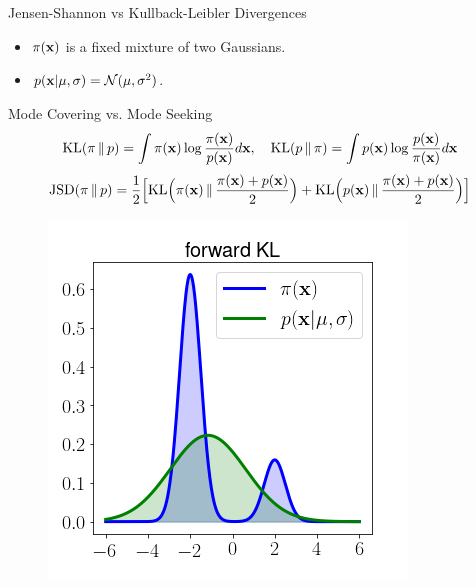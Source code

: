 \documentclass{beamer}
\begin{document}
\begin{frame}{Jensen-Shannon vs Kullback-Leibler Divergences}
	\begin{itemize}
		\item $\pi(\mathbf{x})$ is a fixed mixture of two Gaussians.
		\item $p(\mathbf{x} | \mu, \sigma) = \mathcal{N}(\mu, \sigma^2)$.
	\end{itemize}
	\begin{block}{Mode Covering vs. Mode Seeking}
		\vspace{-0.7cm}
		\[
			\mathrm{KL}(\pi \,\|\, p) = \int \pi(\mathbf{x}) \log \frac{\pi(\mathbf{x})}{p(\mathbf{x})}d\mathbf{x}, \quad \mathrm{KL}(p\,\|\,\pi) = \int p(\mathbf{x}) \log \frac{p(\mathbf{x})}{\pi(\mathbf{x})}d\mathbf{x}
		\]
		\[
			\mathrm{JSD}(\pi \,\|\, p) = \frac{1}{2} \Bigl[\mathrm{KL} \Bigl(\pi(\mathbf{x}) \,\|\, \frac{\pi(\mathbf{x}) + p(\mathbf{x})}{2}\Bigr) + \mathrm{KL} \Bigl(p(\mathbf{x}) \,\|\, \frac{\pi(\mathbf{x}) + p(\mathbf{x})}{2}\Bigr) \Bigr]
		\]
		\vspace{-0.7cm}
		\eqpause
		\begin{minipage}[t]{0.33\columnwidth}
			\begin{figure}
				\includegraphics[width=\linewidth]{figs/forward_KL}
			\end{figure}
		\end{minipage}%
		\begin{minipage}[t]{0.33\columnwidth}
			\begin{figure}

\end{figure}
\end{minipage}
\end{block}
\end{frame}
\end{document}
